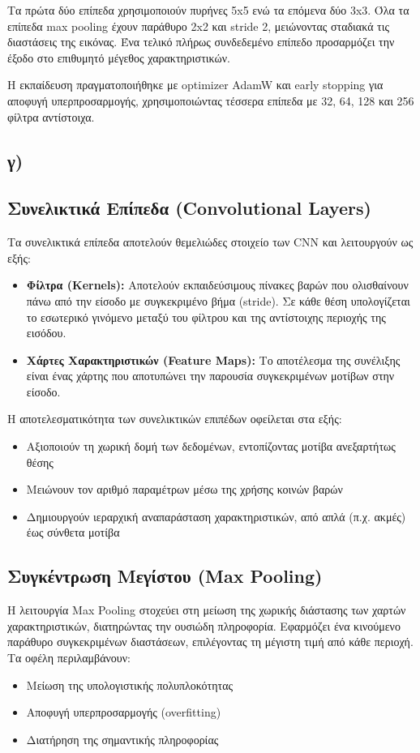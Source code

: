 \documentclass[a4paper,12pt]{article}
\begin{document}
Τα πρώτα δύο επίπεδα χρησιμοποιούν πυρήνες 5x5 ενώ τα επόμενα δύο 3x3. Όλα τα επίπεδα max pooling έχουν παράθυρο 2x2 και stride 2, μειώνοντας σταδιακά τις διαστάσεις της εικόνας. Ένα τελικό πλήρως συνδεδεμένο επίπεδο προσαρμόζει την έξοδο στο επιθυμητό μέγεθος χαρακτηριστικών.

Η εκπαίδευση πραγματοποιήθηκε με optimizer AdamW και early stopping για αποφυγή υπερπροσαρμογής, χρησιμοποιώντας τέσσερα επίπεδα με 32, 64, 128 και 256 φίλτρα αντίστοιχα.

\subsection*{γ)}

\subsection*{Συνελικτικά Επίπεδα (Convolutional Layers)}
Τα συνελικτικά επίπεδα αποτελούν θεμελιώδες στοιχείο των CNN και λειτουργούν ως εξής:

\begin{itemize}
   \item \textbf{Φίλτρα (Kernels):} Αποτελούν εκπαιδεύσιμους πίνακες βαρών που ολισθαίνουν πάνω από την είσοδο με συγκεκριμένο βήμα (stride). Σε κάθε θέση υπολογίζεται το εσωτερικό γινόμενο μεταξύ του φίλτρου και της αντίστοιχης περιοχής της εισόδου.

   \item \textbf{Χάρτες Χαρακτηριστικών (Feature Maps):} Το αποτέλεσμα της συνέλιξης είναι ένας χάρτης που αποτυπώνει την παρουσία συγκεκριμένων μοτίβων στην είσοδο.
\end{itemize}

Η αποτελεσματικότητα των συνελικτικών επιπέδων οφείλεται στα εξής:
\begin{itemize}
   \item Αξιοποιούν τη χωρική δομή των δεδομένων, εντοπίζοντας μοτίβα ανεξαρτήτως θέσης
   \item Μειώνουν τον αριθμό παραμέτρων μέσω της χρήσης κοινών βαρών
   \item Δημιουργούν ιεραρχική αναπαράσταση χαρακτηριστικών, από απλά (π.χ. ακμές) έως σύνθετα μοτίβα
\end{itemize}

\subsection*{Συγκέντρωση Μεγίστου (Max Pooling)}
Η λειτουργία Max Pooling στοχεύει στη μείωση της χωρικής διάστασης των χαρτών χαρακτηριστικών, διατηρώντας την ουσιώδη πληροφορία. Εφαρμόζει ένα κινούμενο παράθυρο συγκεκριμένων διαστάσεων, επιλέγοντας τη μέγιστη τιμή από κάθε περιοχή. Τα οφέλη περιλαμβάνουν:
\begin{itemize}
   \item Μείωση της υπολογιστικής πολυπλοκότητας
   \item Αποφυγή υπερπροσαρμογής (overfitting)
   \item Διατήρηση της σημαντικής πληροφορίας
\end{itemize}
\end{document}
